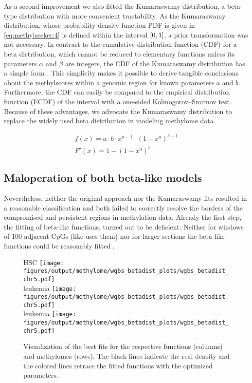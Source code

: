 As a second improvement we also fitted the Kumaraswamy distribution, a beta-type distribution with more convenient tractability\cite{Kumaraswamy1980,Jones2009}. As the Kumaraswamy distribution, whose probability density function PDF is given in \autoref{eq:methylseeker:4} is defined within the interval $\interval{0}{1}$, a prior transformation was not necessary. In contrast to the cumulative distribution function (CDF) for a beta distribution, which cannot be reduced to elementary functions unless its parameters $\alpha$ and $\beta$ are integers, the CDF of the Kumaraswamy distribution has a simple form . This simplicity makes it possible to derive tangible conclusions about the methylscores within a genomic region for known parameters $a$ and $b$. Furthermore, the CDF can easily be compared to the empirical distribution function (ECDF) of the interval with a one-sided Kolmogorov–Smirnov test. Because of these advantages, we advocate the Kumaraswamy distribution to replace the widely used beta distribution\cite{Kuan2010,Burger2013,Hebestreit2013,Song2013} in modeling methylome data.

\begin{eqnarray}
\label{eq:methylseeker:4} f(x) = a\cdot b \cdot x^{a-1} \cdot { (1-x^a)}^{b-1}\\
\label{eq:methylseeker:5} F'(x) = 1 - (1 - x^a)^b
\end{eqnarray}

\subsection{Maloperation of both beta-like models}

Nevertheless, neither the original  approach nor the Kumaraswamy fits resulted in a reasonable classification and both failed to correctly resolve the borders of the compromised and persistent regions in \dnmtchip methylation data. Already the first step, the fitting of beta-like functions, turned out to be deficient: Neither for windows of \num{100} adjacent CpGs (like  uses them) nor for larger sections the beta-like functions could be reasonably fitted .

\begin{figure}[!ht]
	\centering \dnmtwt HSC
	\texttt{[image: figures/output/methylome/wgbs\_betadist\_plots/wgbs\_betadist\_chr5.pdf]} 
	\vspace{0.1em} \\ \dnmtwt \kitpos leukemia	\texttt{[image: figures/output/methylome/wgbs\_betadist\_plots/wgbs\_betadist\_chr5.pdf]}
	\vspace{0.1em} \\ \dnmtchip \kitpos leukemia \texttt{[image: figures/output/methylome/wgbs\_betadist\_plots/wgbs\_betadist\_chr5.pdf]}
	\caption{Visualization of the best fits for the respective functions (columns) and methylomes (rows). The black lines indicate the real density and the colored lines retrace the fitted functions with the optimized parameters.}
	\label{fig:wgbs_betadist_chr3.pdf}
\end{figure}
\clearpage

